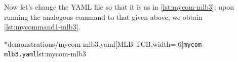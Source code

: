 	Now let's change the YAML file so that it is as in \cref{lst:mycom-mlb3}; upon running
	the analogous command to that given above, we obtain \cref{lst:mycommand1-mlb3}.

	\begin{cmhtcbraster}[
			raster force size=false,
			raster column 1/.style={add to width=-1cm},
		]
		\cmhlistingsfromfile[style=yaml-LST]*{demonstrations/mycom-mlb3.yaml}[MLB-TCB,width=.6\textwidth]{\texttt{mycom-mlb3.yaml}}{lst:mycom-mlb3}
	\end{cmhtcbraster}
